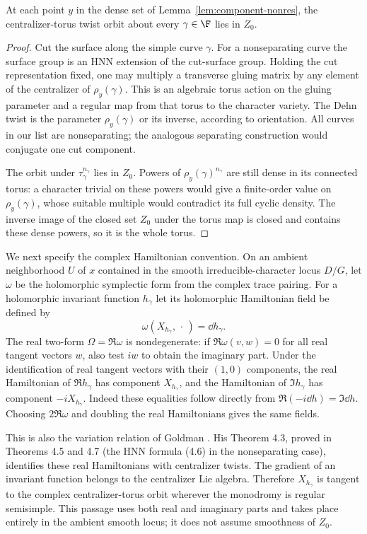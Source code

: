 \begin{lemma}\label{lem:torus-orbit}
At each point $y$ in the dense set of Lemma~\ref{lem:component-nonres},
the centralizer-torus twist orbit about every $\gamma\in\F$ lies in $Z_0$.
\end{lemma}
\begin{proof}
Cut the surface along the simple curve $\gamma$. For a nonseparating
curve the surface group is an HNN extension of the cut-surface group.
Holding the cut representation fixed, one may multiply a transverse
gluing matrix by any element of the centralizer of $\rho_y(\gamma)$.
This is an algebraic torus action on the gluing parameter and a regular
map from that torus to the character variety. The Dehn twist is the
parameter $\rho_y(\gamma)$ or its inverse, according to orientation.
All curves in our list are nonseparating; the analogous separating
construction would conjugate one cut component.

The orbit under $\tau_\gamma^{n_\gamma}$ lies in $Z_0$. Powers of
$\rho_y(\gamma)^{n_\gamma}$ are still dense in its connected torus:
a character trivial on these powers would give a finite-order value on
$\rho_y(\gamma)$, whose suitable multiple would contradict its full
cyclic density. The inverse image of the closed set $Z_0$ under the torus
map is closed and contains these dense powers, so it is the whole torus.
\end{proof}

We next specify the complex Hamiltonian convention. On an ambient
neighborhood $U$ of $x$ contained in the smooth irreducible-character
locus $D/G$, let $\omega$ be the holomorphic symplectic form from the
complex trace pairing. For a holomorphic invariant function $h_\gamma$
let its holomorphic Hamiltonian field be defined by
\[
 \omega(X_{h_\gamma},\,\cdot\,)=\dd h_\gamma.
\]
The real two-form $\Omega=\Re\omega$ is nondegenerate: if
$\Re\omega(v,w)=0$ for all real tangent vectors $w$, also test $iw$ to
obtain the imaginary part. Under the identification of real tangent
vectors with their $(1,0)$ components, the real Hamiltonian of
$\Re h_\gamma$ has component $X_{h_\gamma}$, and the Hamiltonian of
$\Im h_\gamma$ has component $-iX_{h_\gamma}$.
Indeed these equalities follow directly from
$\Re(-i\dd h)=\Im\dd h$. Choosing $2\Re\omega$ and doubling the real
Hamiltonians gives the same fields.

This is also the variation relation of Goldman
\cite[Lemma 1.11]{Goldman}. His Theorem 4.3, proved in Theorems 4.5 and
4.7 (the HNN formula (4.6) in the nonseparating case), identifies these
real Hamiltonians with centralizer twists. The gradient of an invariant
function belongs to the centralizer Lie algebra. Therefore
$X_{h_\gamma}$ is tangent to the complex centralizer-torus orbit wherever
the monodromy is regular semisimple. This passage uses both real and
imaginary parts and takes place entirely in the ambient smooth locus;
it does not assume smoothness of $Z_0$.

